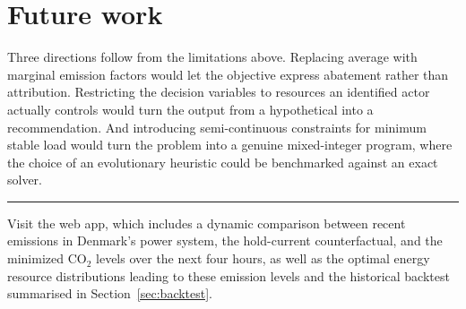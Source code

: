 \documentclass[11pt]{article}
\begin{document}
\section{Future work}

Three directions follow from the limitations above. Replacing average
with marginal emission factors would let the objective express abatement
rather than attribution. Restricting the decision variables to resources
an identified actor actually controls would turn the output from a
hypothetical into a recommendation. And introducing semi-continuous
constraints for minimum stable load would turn the problem into a
genuine mixed-integer program, where the choice of an evolutionary
heuristic could be benchmarked against an exact solver.

\vspace{0.6em}
\noindent\rule{\textwidth}{0.4pt}

\noindent\small
Visit the web app, which includes a dynamic comparison between recent
emissions in Denmark's power system, the hold-current counterfactual, and
the minimized CO$_2$ levels over the next four hours, as well as the
optimal energy resource distributions leading to these emission levels
and the historical backtest summarised in Section~\ref{sec:backtest}.
\end{document}
